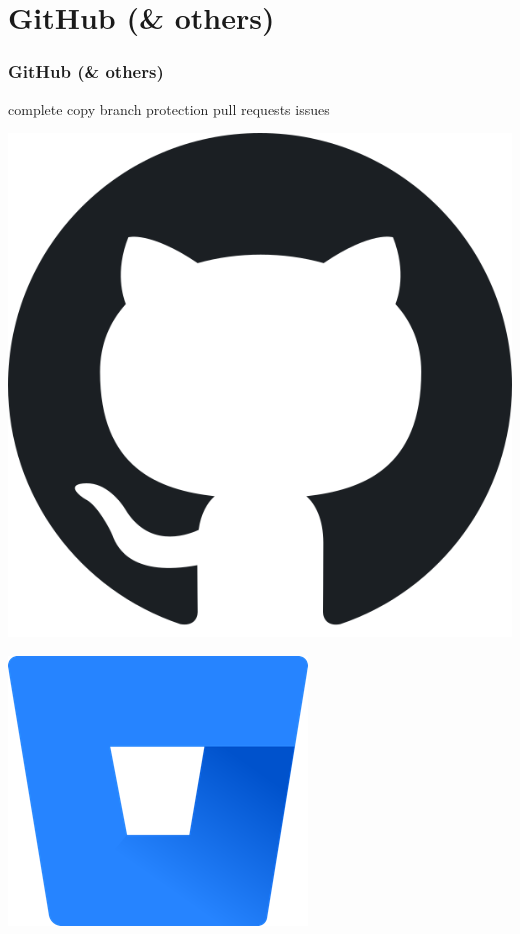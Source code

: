 \documentclass{beamer}
\begin{document}
	\section{GitHub (\& others)}
	\begin{frame}
		\frametitle{GitHub (\& others)}\pause
		
		\begin{minipage}{0.4\textwidth} 
				complete copy \newline\newline
				branch protection \newline\newline
				pull requests \newline\newline
				issues \newline

		\end{minipage}
		\hfill
		\begin{minipage}{0.4\textwidth}
		
		\includegraphics[width=.725\linewidth]{githublogo.png}\newline

		
		
		\includegraphics[width=.725\linewidth]{bitbucketlogo.png}\newline

		
		\label{Bild} 
		\end{minipage}
		
		
		
	
	\end{frame}
	
\end{document}
